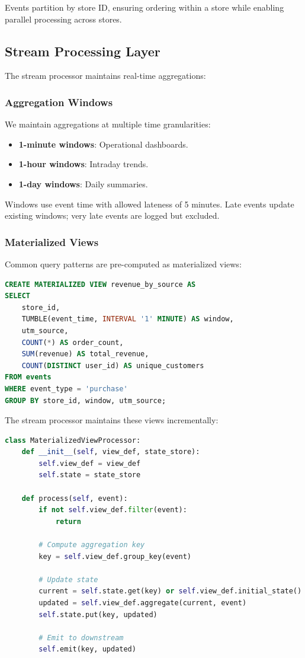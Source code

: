 \documentclass[11pt,twocolumn]{article}
\begin{document}
Events partition by store ID, ensuring ordering within a store while enabling parallel processing across stores.

\subsection{Stream Processing Layer}

The stream processor maintains real-time aggregations:

\subsubsection{Aggregation Windows}

We maintain aggregations at multiple time granularities:

\begin{itemize}
\item \textbf{1-minute windows}: Operational dashboards.
\item \textbf{1-hour windows}: Intraday trends.
\item \textbf{1-day windows}: Daily summaries.
\end{itemize}

Windows use event time with allowed lateness of 5 minutes. Late events update existing windows; very late events are logged but excluded.

\subsubsection{Materialized Views}

Common query patterns are pre-computed as materialized views:

\begin{lstlisting}[language=SQL,caption=Materialized view definition]
CREATE MATERIALIZED VIEW revenue_by_source AS
SELECT
    store_id,
    TUMBLE(event_time, INTERVAL '1' MINUTE) AS window,
    utm_source,
    COUNT(*) AS order_count,
    SUM(revenue) AS total_revenue,
    COUNT(DISTINCT user_id) AS unique_customers
FROM events
WHERE event_type = 'purchase'
GROUP BY store_id, window, utm_source;
\end{lstlisting}

The stream processor maintains these views incrementally:

\begin{lstlisting}[language=Python,caption=Incremental aggregation]
class MaterializedViewProcessor:
    def __init__(self, view_def, state_store):
        self.view_def = view_def
        self.state = state_store

    def process(self, event):
        if not self.view_def.filter(event):
            return

        # Compute aggregation key
        key = self.view_def.group_key(event)

        # Update state
        current = self.state.get(key) or self.view_def.initial_state()
        updated = self.view_def.aggregate(current, event)
        self.state.put(key, updated)

        # Emit to downstream
        self.emit(key, updated)
\end{lstlisting}
\end{document}
